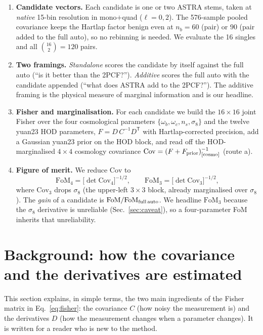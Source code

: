 \documentclass[11pt]{article}
\newcommand{\FoM}{\mathrm{FoM}}
\begin{document}
\begin{enumerate}
\item \textbf{Candidate vectors.}  Each candidate is one or two ASTRA stems,
  taken at \emph{native} 15-bin resolution in mono$+$quad ($\ell=0,2$).  The
  576-sample pooled covariance keeps the Hartlap factor benign even at
  $n_b=60$ (pair) or $90$ (pair added to the full auto), so no rebinning is
  needed.  We evaluate the 16 singles and all $\binom{16}{2}=120$ pairs.
\item \textbf{Two framings.}  \emph{Standalone} scores the candidate by
  itself against the full auto (``is it better than the 2PCF?'').
  \emph{Additive} scores the full auto with the candidate appended
  (``what does ASTRA add to the 2PCF?'').  The additive framing is the
  physical measure of marginal information and is our headline.
\item \textbf{Fisher and marginalisation.}  For each candidate we build the
  $16\times16$ joint Fisher over the four cosmological parameters
  $\{\omega_b,\omega_c,n_s,\sigma_8\}$ and the twelve yuan23 HOD parameters,
  $F = D\,C^{-1}D^{\mathsf T}$ with Hartlap-corrected precision, add a
  Gaussian yuan23 prior on the HOD block, and read off the
  HOD-marginalised $4\times4$ cosmology covariance
  $\mathrm{Cov} = (F+F_{\rm prior})^{-1}_{[\rm cosmo]}$ (route a).
\item \textbf{Figure of merit.}  We reduce $\mathrm{Cov}$ to
  \begin{equation}
    \FoM_4 = \big[\det \mathrm{Cov}_{4}\big]^{-1/2}, \qquad
    \FoM_3 = \big[\det \mathrm{Cov}_{3}\big]^{-1/2},
  \end{equation}
  where $\mathrm{Cov}_3$ drops $\sigma_8$ (the upper-left $3\times3$ block,
  already marginalised over $\sigma_8$).  The \emph{gain} of a candidate is
  $\FoM/\FoM_{\rm full\,auto}$.  We headline $\FoM_3$ because the $\sigma_8$
  derivative is unreliable (Sec.~\ref{sec:caveat}), so a four-parameter FoM
  inherits that unreliability.
\end{enumerate}

\section{Background: how the covariance and the derivatives are estimated}
\label{sec:background}

This section explains, in simple terms, the two main ingredients of the Fisher
matrix in Eq.~\eqref{eq:fisher}: the covariance $C$ (how noisy the measurement is)
and the derivatives $D$ (how the measurement changes when a parameter changes).
It is written for a reader who is new to the method.
\end{document}
